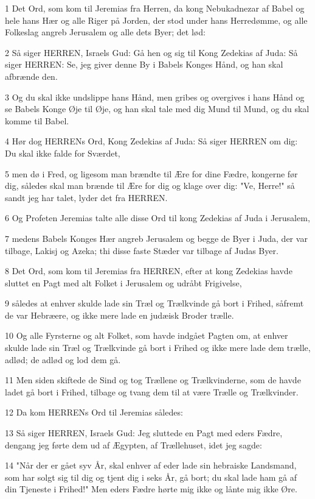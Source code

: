 \par 1 Det Ord, som kom til Jeremias fra Herren, da kong Nebukadnezar af Babel og hele hans Hær og alle Riger på Jorden, der stod under hans Herredømme, og alle Folkeslag angreb Jerusalem og alle dets Byer; det lød:
\par 2 Så siger HERREN, Israels Gud: Gå hen og sig til Kong Zedekias af Juda: Så siger HERREN: Se, jeg giver denne By i Babels Konges Hånd, og han skal afbrænde den.
\par 3 Og du skal ikke undslippe hans Hånd, men gribes og overgives i hans Hånd og se Babels Konge Øje til Øje, og han skal tale med dig Mund til Mund, og du skal komme til Babel.
\par 4 Hør dog HERRENs Ord, Kong Zedekias af Juda: Så siger HERREN om dig: Du skal ikke falde for Sværdet,
\par 5 men dø i Fred, og ligesom man brændte til Ære for dine Fædre, kongerne før dig, således skal man brænde til Ære for dig og klage over dig: "Ve, Herre!" så sandt jeg har talet, lyder det fra HERREN.
\par 6 Og Profeten Jeremias talte alle disse Ord til kong Zedekias af Juda i Jerusalem,
\par 7 medens Babels Konges Hær angreb Jerusalem og begge de Byer i Juda, der var tilbage, Lakisj og Azeka; thi disse faste Stæder var tilbage af Judas Byer.
\par 8 Det Ord, som kom til Jeremias fra HERREN, efter at kong Zedekias havde sluttet en Pagt med alt Folket i Jerusalem og udråbt Frigivelse,
\par 9 således at enhver skulde lade sin Træl og Trælkvinde gå bort i Frihed, såfremt de var Hebræere, og ikke mere lade en judæisk Broder trælle.
\par 10 Og alle Fyrsterne og alt Folket, som havde indgået Pagten om, at enhver skulde lade sin Træl og Trælkvinde gå bort i Frihed og ikke mere lade dem trælle, adlød; de adlød og lod dem gå.
\par 11 Men siden skiftede de Sind og tog Trællene og Trælkvinderne, som de havde ladet gå bort i Frihed, tilbage og tvang dem til at være Trælle og Trælkvinder.
\par 12 Da kom HERRENs Ord til Jeremias således:
\par 13 Så siger HERREN, Israels Gud: Jeg sluttede en Pagt med eders Fædre, dengang jeg førte dem ud af Ægypten, af Trællehuset, idet jeg sagde:
\par 14 "Når der er gået syv År, skal enhver af eder lade sin hebraiske Landsmand, som har solgt sig til dig og tjent dig i seks År, gå bort; du skal lade ham gå af din Tjeneste i Frihed!" Men eders Fædre hørte mig ikke og lånte mig ikke Øre.
